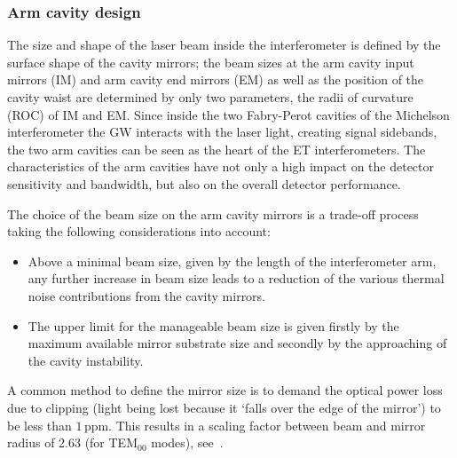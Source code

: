 \subsubsection{Arm cavity design}
\label{sec:arm_cavity_design}
The size and shape of the laser beam inside the interferometer is defined by the
surface shape of the cavity mirrors; the beam sizes at the arm cavity input
mirrors (IM) and arm cavity end mirrors (EM) as well as the position of the
cavity waist are determined by only two parameters, the radii of curvature (ROC)
of IM and EM. Since inside the two Fabry-Perot cavities of the Michelson
interferometer the GW interacts with the laser light, creating signal sidebands,
the two arm cavities can be seen as the heart of the ET interferometers. The
characteristics of the arm cavities have not only a high impact on the detector
sensitivity and bandwidth, but also on the overall detector performance.


The choice of the beam size on the arm cavity mirrors is a trade-off process
taking the following considerations into account:
\begin{itemize}
\item Above a minimal beam size, given by the length of the interferometer arm,
any further increase in beam size leads to a reduction of the various 
thermal noise contributions from the cavity mirrors.
\item The upper limit for the manageable beam size is given firstly by
the maximum available mirror substrate size and secondly by the approaching of
the cavity instability.
\end{itemize}

A common method to define the mirror size is to demand the optical power loss
due to clipping (light being lost because it `falls over the edge of the
mirror') to be less than $1\,$ppm. This results in a scaling factor between 
beam and mirror radius of 2.63 (for TEM$_{00}$ modes), see~\cite{Chelkowski2009}.

